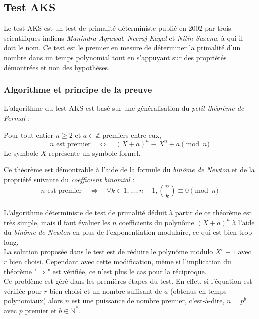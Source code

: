 \subsection{Test AKS}
	Le test AKS est un test de primalité déterministe publié en 2002 par trois scientifiques indiens \textit{Manindra Agrawal}, \textit{Neeraj Kayal} et \textit{Nitin Saxena}, à qui il doit le nom. Ce test est le premier en mesure de déterminer la primalité d'un nombre dans un temps polynomial tout en s'appuyant sur des propriétés démontrées et non des hypothèses.
		

	\subsubsection{Algorithme et principe de la preuve}
		L'algorithme du test AKS est basé sur une généralisation du \textit{petit théorème de Fermat} :
		
		\vspace{-1.5em}\begin{adjustwidth}{1.5cm}{1.5cm} 
		\begin{Th}
			\label{ThFermat4}
			Pour tout entier $n \geqslant 2$ et $a \in \mathbb{Z}$ premiers entre eux,
			\[n \text{  est premier} \quad \Leftrightarrow \quad (X + a)^{n} \equiv X^{n} + a \pmod n\] 
			Le symbole $X$ représente un symbole formel.
		\end{Th}
		\end{adjustwidth}\vspace{0.5em}
		
		Ce théorème est démontrable à l'aide de la formule du \textit{binôme de Newton} et de la propriété suivante du \textit{coefficient binomial} :
		\[n \text{  est premier} \quad \Leftrightarrow \quad \forall k \in {1, ...,n-1}, \binom{n}{k} \equiv 0 \pmod n\]
		
		\paragraph{}L'algorithme déterministe de test de primalité déduit à partir de ce théorème est très simple, mais il faut évaluer les $n$ coefficients du polynôme $(X + a)^{n}$ à l'aide du \textit{binôme de Newton} en plus de l'exponentiation modulaire, ce qui est bien trop long.\\
		\indent La solution proposée dans le test est de réduire le polynôme modulo $X^{r} - 1$ avec $r$ bien choisi. Cependant avec cette modification, même si l'implication du théorème "$\Rightarrow$" est vérifiée, ce n'est plus le cas pour la réciproque.\\
		\indent Ce problème est géré dans les premières étapes du test. En effet, si l'équation est vérifiée pour $r$ bien choisi et un nombre suffisant de $a$ (obtenus en temps polynomiaux) alors $n$ est une puissance de nombre premier, c'est-à-dire, $n = p^{b}$ avec $p$ premier et $b \in \mathbb{N}^{*}$.\\
		
